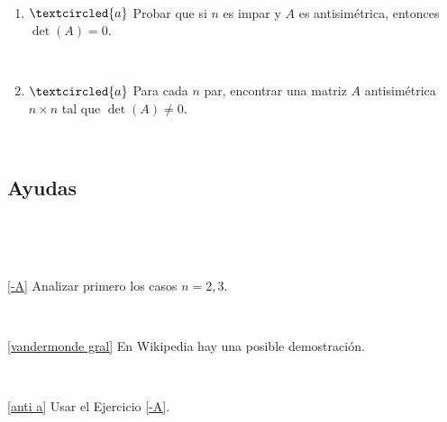 \documentclass[12pt]{amsart}
\begin{document}
\begin{enumerate}[resume]
\

\begin{enumerate}
\item\label{anti a} $\textcircled{a}$ Probar que si $n$ es impar y $A$ es antisim\'etrica, entonces
$\det(A)=0$.

\

\item\label{anti b} $\textcircled{a}$ Para cada $n$ par, encontrar una matriz $A$ antisim\'etrica
$n \times n$ tal que $\det(A)\not=0$.
\end{enumerate}

%
	
	
\end{enumerate}

\

\subsection*{Ayudas}

\

\

\eqref{-A} Analizar primero los casos $n=2,3$.

\

\eqref{vandermonde gral} En Wikipedia hay una posible demostraci\'on.

\

\eqref{anti a} Usar el Ejercicio \eqref{-A}.

\
\end{document}
